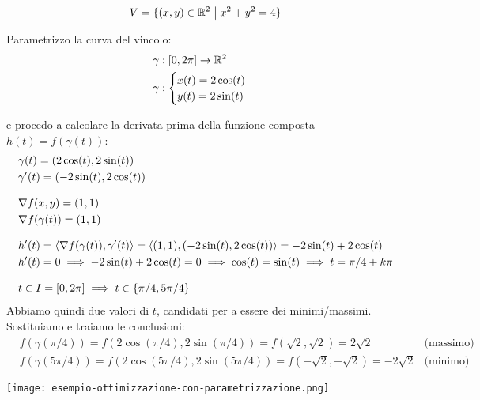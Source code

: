 \[
    V = \{(x,y) \in \mathbb{R}^{2} \;\big|\; x^{2}+y^{2}=4\}
\]

Parametrizzo la curva del vincolo:
\begin{align*}
     & \gamma : [0,2\pi] \to \mathbb{R}^2 \\
     & \gamma : \begin{cases}
                    x(t) = 2\cos(t) \\
                    y(t) = 2\sin(t)
                \end{cases}
\end{align*}

e procedo a calcolare la derivata prima della funzione composta \(h(t) = f(\gamma(t))\):
\begin{align*}
     & \gamma(t) = (2\cos(t), 2\sin(t))                                                                             \\
     & \gamma'(t) = (-2\sin(t), 2\cos(t))                                                                           \\[3mm]
     & \nabla f(x,y) = (1,1)                                                                                        \\
     & \nabla f(\gamma(t)) = (1,1)                                                                                  \\[3mm]
     & h'(t) = \langle\nabla f(\gamma(t)),\gamma'(t)\rangle = \langle(1,1),(-2\sin(t), 2\cos(t))\rangle = -2\sin(t) +2\cos(t) \\
     & h'(t) = 0 \implies -2\sin(t) +2\cos(t) = 0 \implies \cos(t) = \sin(t) \implies t = \pi/4 + k\pi              \\[3mm]
     & t \in I = [0,2\pi] \implies t \in \{ \pi/4, 5\pi/4 \}
\end{align*}
Abbiamo quindi due valori di \(t\), candidati per a essere dei minimi/massimi. Sostituiamo e traiamo le conclusioni:
\begin{align*}
     & f(\gamma(\pi/4)) = f(2\cos(\pi/4), 2\sin(\pi/4)) = f(\sqrt{2}, \sqrt{2}) = 2\sqrt{2}       & \text{(massimo)} \\
     & f(\gamma(5\pi/4)) = f(2\cos(5\pi/4), 2\sin(5\pi/4)) = f(-\sqrt{2}, -\sqrt{2}) = -2\sqrt{2} & \text{(minimo)}
\end{align*}

\begin{center}
    \texttt{[image: esempio-ottimizzazione-con-parametrizzazione.png]}
\end{center}

